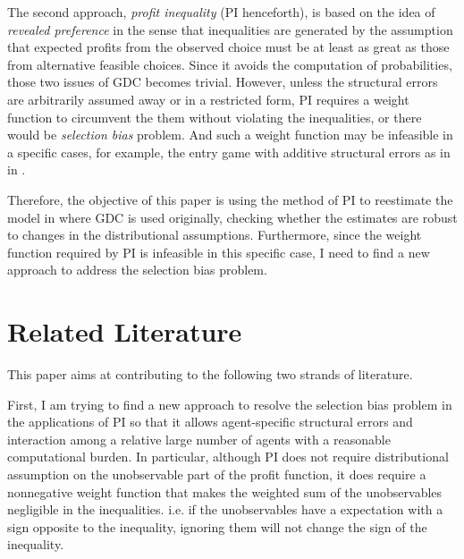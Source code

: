 \documentclass[a4paper]{article}
\begin{document}
The second approach, \textit{profit inequality} (PI henceforth), is based on the idea of \textit{revealed preference} in the sense that inequalities are generated by the assumption that expected profits from the observed choice must be at least as great as those from alternative feasible choices. Since it avoids the computation of probabilities, those two issues of GDC becomes trivial. However, unless the structural errors are arbitrarily assumed away or in a restricted form, PI requires a weight function to circumvent the them without violating the inequalities, or there would be \textit{selection bias} problem. And such a weight function may be infeasible in a specific cases,  for example, the entry game with additive structural errors as in in \cite{ciliberto2009market}.

Therefore, the objective of this paper is using the method of PI to reestimate the model in \cite{ciliberto2009market} where GDC is used originally, checking whether the estimates are robust to changes in the distributional assumptions. Furthermore, since the weight function required by PI is infeasible in this specific case, I need to find a new approach to address the selection bias problem.




\section{Related Literature}

This paper aims at contributing to the following two strands of literature.

First, I am trying to find a new approach to resolve the selection bias problem in the applications of PI so that it allows agent-specific structural errors and interaction among a relative large number of agents with a reasonable computational burden. In particular, although PI does not require distributional assumption on the unobservable part of the profit function, it does require a nonnegative weight function that makes the weighted sum of the unobservables negligible in the inequalities. i.e. if the unobservables have a expectation with a sign opposite to the inequality, ignoring them will not change the sign of the inequality. 
\end{document}
